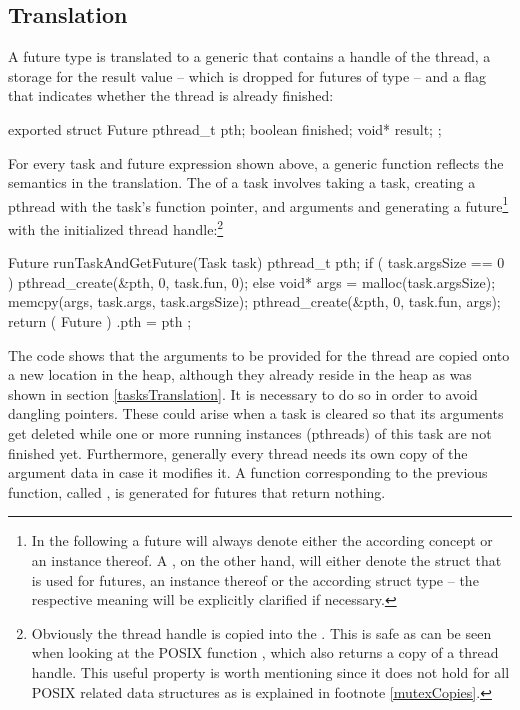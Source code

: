 \subsection{Translation}
\label{futuresTranslation}
A future type  is translated to a generic  that contains a handle of the thread, a storage for the result value -- which is dropped for futures of type  -- and a flag that indicates whether the thread is already finished:
\begin{ccode}
exported struct Future { 
  pthread_t pth; 
  boolean finished; 
  void* result; 
};
\end{ccode}

For every task and future expression shown above, a generic function reflects the semantics in the translation. The  of a task involves taking a task, creating a pthread with the task's function pointer, and arguments and generating a future\footnote{In the following a future will always denote either the according concept or an instance thereof. A , on the other hand, will either denote the struct that is used for futures, an instance thereof or the according struct type -- the respective meaning will be explicitly clarified if necessary.} with the initialized thread handle:\footnote{Obviously the thread handle is copied into the . This is safe as can be seen when looking at the POSIX function , which also returns a copy of a thread handle. This useful property is worth mentioning since it does not hold for all POSIX related data structures as is explained in footnote \ref{mutexCopies}.}
\begin{ccode}
Future runTaskAndGetFuture(Task task) { 
  pthread_t pth;
  if ( task.argsSize == 0 ) {
      pthread_create(&pth, 0, task.fun, 0);
  } else {
    void* args = malloc(task.argsSize);
    memcpy(args, task.args, task.argsSize);
    pthread_create(&pth, 0, task.fun, args);
  }
  return ( Future ){ .pth = pth }; 
}
\end{ccode}
The code shows that the arguments to be provided for the thread are copied onto a new location in the heap, although they already reside in the heap as was shown in section \ref{tasksTranslation}. It is necessary to do so in order to avoid dangling pointers. These could arise when a task is cleared so that its arguments get deleted while one or more running instances (pthreads) of this task are not finished yet. Furthermore, generally every thread needs its own copy of the argument data in case it modifies it. A function corresponding to the previous function, called , is generated for futures that return nothing. 



